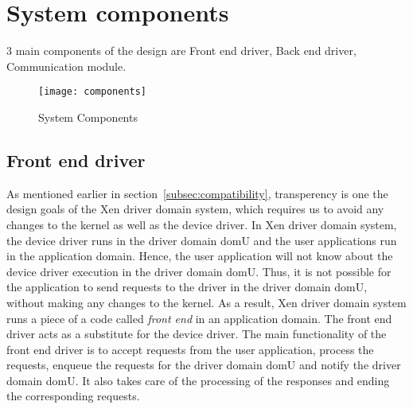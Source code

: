 \section{System components}\label{components}
3 main components of the design are Front end driver, Back end driver, Communication module.
\begin{figure}[!ht]
\centering
\texttt{[image: components]}
\caption{System Components}
\label{fig:Design Evo1}
\end{figure}

\subsection{Front end driver}
\label{subsec:frontend}
As mentioned earlier in section~\ref{subsec:compatibility}, transperency is one the design goals of the Xen driver domain system, which requires us to avoid any changes to the kernel as well as the device driver. In Xen driver domain system, the device driver runs in the driver domain domU and the user applications run in the application domain. Hence, the user application will not know about the device driver execution in the driver domain domU. Thus, it is not possible for the application to send requests to the driver in the driver domain domU, without making any changes to the kernel. As a result, Xen driver domain system runs a piece of a code called \textit{front end} in an application domain. The front end driver acts as a substitute for the device driver. The main functionality of the front end driver is to accept requests from the user application, process the requests, enqueue the requests for the driver domain domU and notify the driver domain domU. It also takes care of the processing of the responses and ending the corresponding requests.

